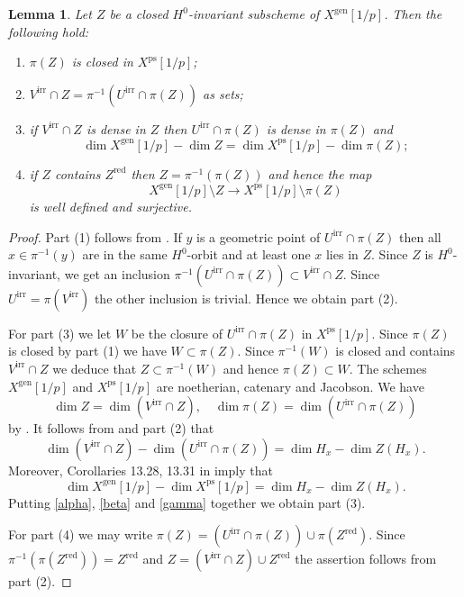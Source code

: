 \documentclass{amsart}
\newtheorem{lem}[prop]{Lemma}
\theoremstyle{definition}
\theoremstyle{remark}
\newcommand{\gen}{\mathrm{gen}}
\newcommand{\red}{\mathrm{red}}
\newcommand{\irr}{\mathrm{irr}}
\newcommand{\ps}{\mathrm{ps}}
\begin{document}
\begin{lem}\label{topo} Let $Z$ be a closed $H^0$-invariant 
subscheme of $X^{\gen}[1/p]$. Then the following hold: 
\begin{enumerate}
\item $\pi(Z)$ is closed in $X^{\ps}[1/p]$;
\item $V^{\irr}\cap Z = \pi^{-1}(U^{\irr}\cap \pi(Z))$ as sets;
\item if $V^{\irr}\cap Z$ is dense in $Z$ 
then $U^{\irr}\cap \pi(Z)$ is dense in $\pi(Z)$ and 
$$\dim X^{\gen}[1/p] - \dim Z = \dim X^{\ps}[1/p] - \dim \pi(Z);$$
\item if $Z$ contains $Z^{\red}$ then $Z=\pi^{-1}(\pi(Z))$ and hence the map 
$$X^{\gen}[1/p]\setminus Z \rightarrow X^{\ps}[1/p]\setminus \pi(Z)$$
is well defined and surjective.
\end{enumerate}
\end{lem}
\begin{proof}
Part (1) follows from \cite[Theorem 3 (iii)]{seshadri}. If $y$ is a geometric point of  $U^{\irr}\cap \pi(Z)$ then all $x\in \pi^{-1}(y)$ 
are in the same $H^0$-orbit and at least one $x$ lies in $Z$. Since $Z$
is $H^0$-invariant, we get an inclusion $\pi^{-1}(U^{\irr}\cap \pi(Z))\subset V^{\irr}\cap Z$. Since $U^{\irr}=\pi(V^{\irr})$ the other inclusion is trivial. Hence we obtain part (2). 

For part (3) we let $W$ be the closure of $U^{\irr}\cap \pi(Z)$ in $X^{\ps}[1/p]$. Since $\pi(Z)$ is closed by part (1) we have $W\subset \pi(Z)$. Since 
$\pi^{-1}(W)$ is closed and contains $V^{\irr}\cap Z$ we deduce that $Z\subset \pi^{-1}(W)$ and hence $\pi(Z)\subset W$. The schemes 
$X^{\gen}[1/p]$ and $X^{\ps}[1/p]$ 
are noetherian, catenary and Jacobson. We
have 
\begin{equation}\label{alpha}
\dim Z= \dim (V^{\irr}\cap Z), \quad \dim \pi(Z)=\dim (U^{\irr}\cap \pi(Z))
\end{equation}
by \cite[\href{https://stacks.math.columbia.edu/tag/0DRT}{Tag 0DRT}]{stacks-project}. It follows from \cite[Corollary 9.10]{defG} and part (2) that 
\begin{equation}\label{beta}
\dim (V^{\irr}\cap Z) - \dim (U^{\irr}\cap \pi(Z)) = 
\dim H_x - \dim Z(H_x).
\end{equation}
Moreover, Corollaries 13.28, 13.31 in \cite{defG} imply that 
\begin{equation}\label{gamma}
\dim X^{\gen}[1/p]-\dim X^{\ps}[1/p]= \dim H_x - \dim Z(H_x).
\end{equation}
Putting \eqref{alpha}, \eqref{beta} and \eqref{gamma} together we obtain part (3). 

For part (4) we may write 
$\pi(Z)= (U^{\irr}\cap \pi(Z)) \cup \pi(Z^{\red})$. Since $\pi^{-1}(\pi(Z^{\red}))=Z^{\red}$
and $Z= (V^{\irr}\cap Z) \cup Z^{\red}$ the assertion follows from part (2).
\end{proof}
\end{document}

